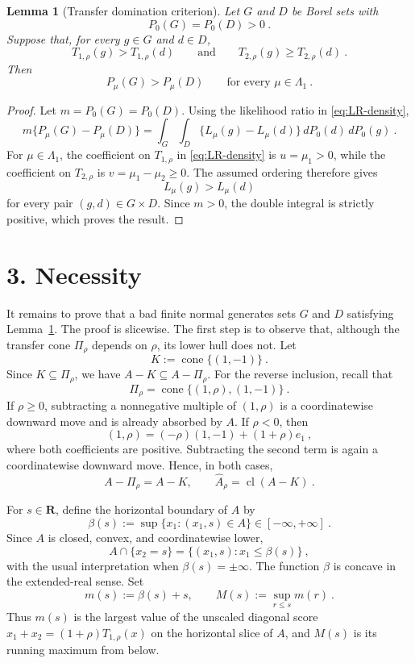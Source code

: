 \documentclass[12pt]{article}
\newtheorem{lemma}{Lemma}
\theoremstyle{remark}
\begin{document}
\begin{lemma}[Transfer domination criterion]\label{lem:transfer}
Let $G$ and $D$ be Borel sets with
\[
P_0(G)=P_0(D)>0~.
\]
Suppose that, for every $g\in G$ and $d\in D$,
\[
T_{1,\rho}(g)>T_{1,\rho}(d)
\qquad\text{and}\qquad
T_{2,\rho}(g)\ge T_{2,\rho}(d)~.
\]
Then
\[
P_\mu(G)>P_\mu(D)
\qquad\text{for every }\mu\in\Lambda_1~.
\]
\end{lemma}

\begin{proof}
Let $m=P_0(G)=P_0(D)$.  Using the likelihood ratio in
\eqref{eq:LR-density},
\[
m\{P_\mu(G)-P_\mu(D)\}
=
\int_G\int_D
\{L_\mu(g)-L_\mu(d)\}\,dP_0(d)\,dP_0(g)~.
\]
For $\mu\in\Lambda_1$, the coefficient on $T_{1,\rho}$ in
\eqref{eq:LR-density} is $u=\mu_1>0$, while the coefficient on
$T_{2,\rho}$ is $v=\mu_1-\mu_2\ge0$.  The assumed ordering therefore gives
\[
L_\mu(g)>L_\mu(d)
\]
for every pair $(g,d)\in G\times D$.  Since $m>0$, the double integral is
strictly positive, which proves the result.
\end{proof}

\section*{3. Necessity}

It remains to prove that a bad finite normal generates sets $G$ and $D$
satisfying Lemma~\ref{lem:transfer}.  The proof is slicewise.  The first step is
to observe that, although the transfer cone $\Pi_\rho$ depends on $\rho$, its
lower hull does not.  Let
\[
K:=\operatorname{cone}\{(1,-1)\}~.
\]
Since $K\subseteq\Pi_\rho$, we have $A-K\subseteq A-\Pi_\rho$.  For the reverse
inclusion, recall that
\[
\Pi_\rho=\operatorname{cone}\{(1,\rho),(1,-1)\}~.
\]
If $\rho\ge0$, subtracting a nonnegative multiple of $(1,\rho)$ is a
coordinatewise downward move and is already absorbed by $A$.  If $\rho<0$,
then
\[
(1,\rho)=(-\rho)(1,-1)+(1+\rho)e_1~,
\]
where both coefficients are positive.  Subtracting the second term is again a
coordinatewise downward move.  Hence, in both cases,
\begin{equation}\label{eq:hull-reduction}
A-\Pi_\rho=A-K,
\qquad
\widehat A_\rho=\operatorname{cl}(A-K)~.
\end{equation}

For $s\in\mathbf R$, define the horizontal boundary of $A$ by
\[
\beta(s):=\sup\{x_1:(x_1,s)\in A\}\in[-\infty,+\infty]~.
\]
Since $A$ is closed, convex, and coordinatewise lower,
\[
A\cap\{x_2=s\}=\{(x_1,s):x_1\le\beta(s)\}~,
\]
with the usual interpretation when $\beta(s)=\pm\infty$.  The function
$\beta$ is concave in the extended-real sense.  Set
\[
m(s):=\beta(s)+s,
\qquad
M(s):=\sup_{r\le s}m(r)~.
\]
Thus $m(s)$ is the largest value of the unscaled diagonal score
$x_1+x_2=(1+\rho)T_{1,\rho}(x)$ on the horizontal slice of $A$, and $M(s)$ is
its running maximum from below.
\end{document}
